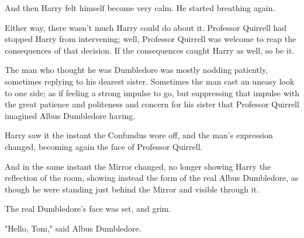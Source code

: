 And then Harry felt himself become very calm. He started breathing again.

Either way, there wasn't much Harry could do about it. Professor Quirrell had
stopped Harry from intervening; well, Professor Quirrell was welcome to reap
the consequences of that decision. If the consequences caught Harry as well, so
be it.

The man who thought he was Dumbledore was mostly nodding patiently, sometimes
replying to his dearest sister. Sometimes the man cast an uneasy look to one
side; as if feeling a strong impulse to go, but suppressing that impulse with
the great patience and politeness and concern for his sister that Professor
Quirrell imagined Albus Dumbledore having.

Harry saw it the instant the Confundus wore off, and the man's expression
changed, becoming again the face of Professor Quirrell.

And in the same instant the Mirror changed, no longer showing Harry the
reflection of the room, showing instead the form of the real Albus Dumbledore,
as though he were standing just behind the Mirror and visible through it.

The real Dumbledore's face was set, and grim.

"Hello, Tom," said Albus Dumbledore.
